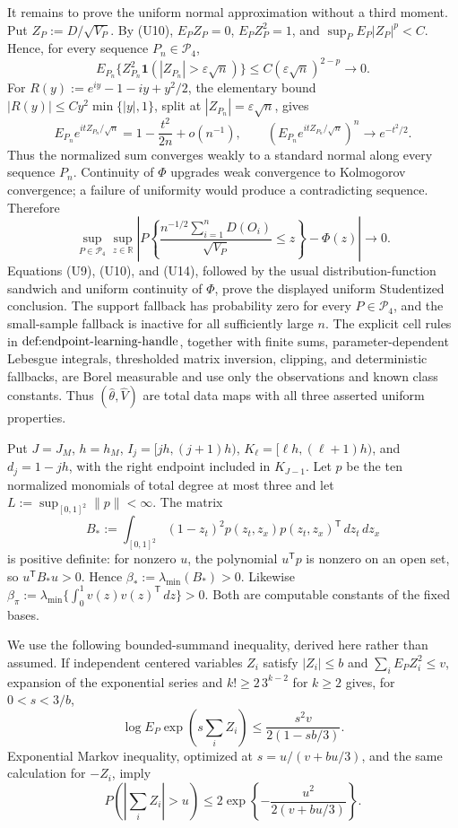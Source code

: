 It remains to prove the uniform normal approximation without a third moment.  Put \(Z_P:=D/\sqrt{V_P}\).  By (U10), \(E_PZ_P=0\), \(E_PZ_P^2=1\), and \(\sup_PE_P|Z_P|^p<C\).  Hence, for every sequence \(P_n\in\mathcal P_4\),
\[
 E_{P_n}\{Z_{P_n}^2\mathbf 1(|Z_{P_n}|>\varepsilon\sqrt n)\}
 \le C(\varepsilon\sqrt n)^{2-p}\longrightarrow0.                    \tag{U15}
\]
For \(R(y):=e^{iy}-1-iy+y^2/2\), the elementary bound \(|R(y)|\le Cy^2\min\{|y|,1\}\), split at \(|Z_{P_n}|=\varepsilon\sqrt n\), gives
\[
 E_{P_n}e^{itZ_{P_n}/\sqrt n}=1-\frac{t^2}{2n}+o(n^{-1}),
 \qquad \left(E_{P_n}e^{itZ_{P_n}/\sqrt n}\right)^n\longrightarrow e^{-t^2/2}. \tag{U16}
\]
Thus the normalized sum converges weakly to a standard normal along every sequence \(P_n\).  Continuity of \(\Phi\) upgrades weak convergence to Kolmogorov convergence; a failure of uniformity would produce a contradicting sequence.  Therefore
\[
 \sup_{P\in\mathcal P_4}\sup_{z\in\mathbb R}
 \left|P\!\left\{
 \frac{n^{-1/2}\sum_{i=1}^nD(O_i)}{\sqrt{V_P}}\le z
 \right\}-\Phi(z)\right|\longrightarrow0.                            \tag{U17}
\]
Equations (U9), (U10), and (U14), followed by the usual distribution-function sandwich and uniform continuity of \(\Phi\), prove the displayed uniform Studentized conclusion.  The support fallback has probability zero for every \(P\in\mathcal P_4\), and the small-sample fallback is inactive for all sufficiently large \(n\).  The explicit cell rules in \(\textnormal{def:endpoint-learning-handle}\), together with finite sums, parameter-dependent Lebesgue integrals, thresholded matrix inversion, clipping, and deterministic fallbacks, are Borel measurable and use only the observations and known class constants.  Thus \((\widehat\theta,\widehat V)\) are total data maps with all three asserted uniform properties.

Put \(J=J_M\), \(h=h_M\), \(I_j=[jh,(j+1)h)\), \(K_\ell=[\ell h,(\ell+1)h)\), and \(d_j=1-jh\), with the right endpoint included in \(K_{J-1}\).  Let \(p\) be the ten normalized monomials of total degree at most three and let \(L:=\sup_{[0,1]^2}\lVert p\rVert<\infty\).  The matrix
\[
 B_*:=\int_{[0,1]^2}(1-z_t)^2p(z_t,z_x)p(z_t,z_x)^{\mathsf T}\,dz_t\,dz_x
\]
is positive definite: for nonzero \(u\), the polynomial \(u^{\mathsf T}p\) is nonzero on an open set, so \(u^{\mathsf T}B_*u>0\).  Hence \(\beta_*:=\lambda_{\min}(B_*)>0\).  Likewise \(\beta_\pi:=\lambda_{\min}\{\int_0^1v(z)v(z)^{\mathsf T}\,dz\}>0\).  Both are computable constants of the fixed bases.

We use the following bounded-summand inequality, derived here rather than assumed.  If independent centered variables \(Z_i\) satisfy \(|Z_i|\le b\) and \(\sum_iE_PZ_i^2\le v\), expansion of the exponential series and \(k!\ge2\,3^{k-2}\) for \(k\ge2\) gives, for \(0<s<3/b\),
\[
 \log E_P\exp\!\left(s\sum_iZ_i\right)
 \le\frac{s^2v}{2(1-sb/3)}.
\]
Exponential Markov inequality, optimized at \(s=u/(v+bu/3)\), and the same calculation for \(-Z_i\), imply
\[
 P\!\left(\left|\sum_iZ_i\right|>u\right)
 \le2\exp\!\left\{-\frac{u^2}{2(v+bu/3)}\right\}.                    \tag{C1}
\]

